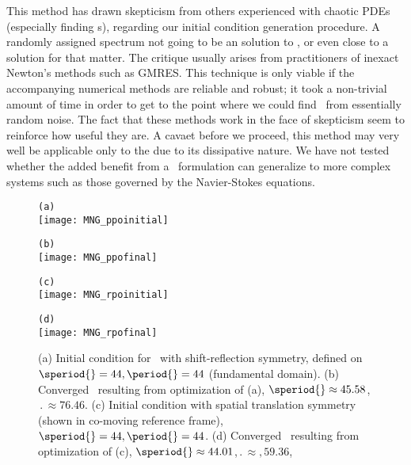 This method has drawn skepticism
from others experienced
with chaotic PDEs (especially finding {\po}s),
regarding our initial condition generation procedure.
A randomly assigned spectrum
not going to be an solution to ,
or even close to a solution for that matter.
The critique usually arises from practitioners
of inexact Newton's methods such as GMRES.
This technique is only viable if the
accompanying numerical methods are reliable and robust; it took
a non-trivial amount of time in order to get to
the point where we could find \twots\ from essentially random noise.
The fact that these methods work in the face of skepticism
seem to reinforce how useful they are.
A cavaet before we proceed,
this method may very well be applicable only to the \KSe due to its
dissipative nature. We have not tested whether the added benefit
from a \spt\ formulation can generalize to more complex
systems such as those governed by the Navier-Stokes equations.


\begin{figure}
\begin{minipage}[height=.05\textheight]{.5\textwidth}
\centering
\small{\texttt{(a)}} \\
\texttt{[image: MNG\_ppoinitial]}
\end{minipage}
\begin{minipage}[height=.2\textheight]{.5\textwidth}
\centering
\small{\texttt{(b)}} \\
\texttt{[image: MNG\_ppofinal]}
\end{minipage}
\begin{minipage}[height=.2\textheight]{.5\textwidth}
\centering
\small{\texttt{(c)}} \\
\texttt{[image: MNG\_rpoinitial]}
\end{minipage}
\begin{minipage}[height=.2\textheight]{.5\textwidth}
\centering
\small{\texttt{(d)}} \\
\texttt{[image: MNG\_rpofinal]}
\end{minipage}
\caption{ \label{fig:KStrawl}
(a) Initial condition for \twot\ with shift-reflection symmetry, defined on
$\speriod{}=44,\period{}=44$ (fundamental domain). (b) Converged \twot\
resulting from optimization of (a), $\speriod{}\approx 45.58$,$\period{}\approx 76.46$.
(c) Initial condition with spatial translation symmetry (shown in co-moving reference frame),
$\speriod{}=44,\period{}=44$. (d) Converged \twot\ resulting from optimization
of (c), $\speriod{}\approx 44.01$,$\period{}\approx,59.36$,}
\end{figure}

